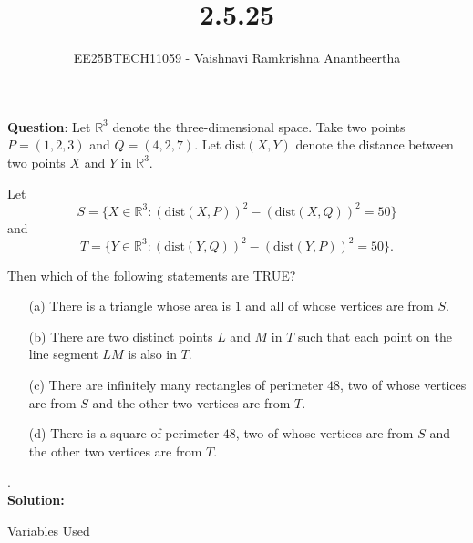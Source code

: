 \documentclass[journal]{IEEEtran}
\title{2.5.25}
\author{EE25BTECH11059 - Vaishnavi Ramkrishna Anantheertha}
\begin{document}
\maketitle

\renewcommand{\thefigure}{\theenumi}
\renewcommand{\thetable}{\theenumi}


\textbf{Question}:
Let $\mathbb{R}^3$ denote the three-dimensional space. 
Take two points $P = (1,2,3)$ and $Q = (4,2,7)$. 
Let $\text{dist}(X,Y)$ denote the distance between two points $X$ and $Y$ in $\mathbb{R}^3$. 

Let
\[
S = \{X \in \mathbb{R}^3 : (\text{dist}(X,P))^2 - (\text{dist}(X,Q))^2 = 50 \}
\]
and
\[
T = \{Y \in \mathbb{R}^3 : (\text{dist}(Y,Q))^2 - (\text{dist}(Y,P))^2 = 50 \}.
\]

Then which of the following statements are TRUE? 

\begin{enumerate}
    \item[(a)] There is a triangle whose area is $1$ and all of whose vertices are from $S$.
    \item[(b)] There are two distinct points $L$ and $M$ in $T$ such that each point on the line segment $LM$ is also in $T$.
    \item[(c)] There are infinitely many rectangles of perimeter $48$, two of whose vertices are from $S$ and the other two vertices are from $T$.
    \item[(d)] There is a square of perimeter $48$, two of whose vertices are from $S$ and the other two vertices are from $T$.
\end{enumerate}.
\\
\textbf{Solution: }\\
\begin{table}[H]    
  \centering
  
  \caption{Variables Used}
  \label{tab:1.10.25}
\end{table}
\end{document}
